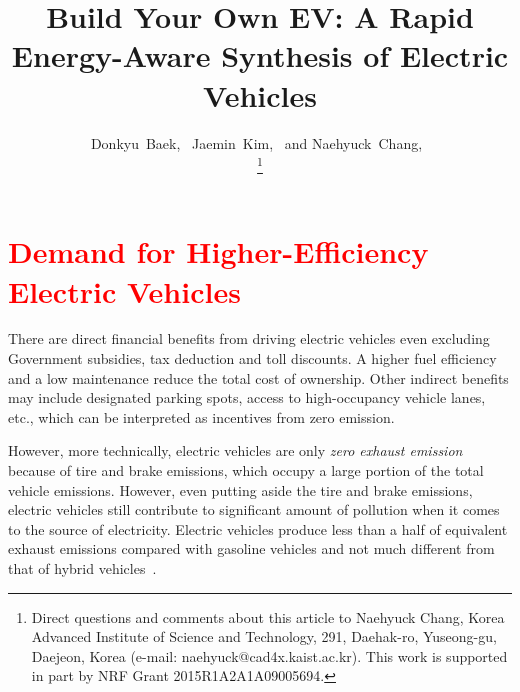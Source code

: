\documentclass[journal]{IEEEtran}
\begin{document}
\title{Build Your Own EV: A Rapid Energy-Aware Synthesis of Electric Vehicles}

\author{
	Donkyu~Baek,~
	Jaemin~Kim,~ and
	Naehyuck~Chang,~
	
\thanks{Direct questions and comments about this article to Naehyuck Chang, Korea Advanced Institute of Science and Technology, 291, Daehak-ro, Yuseong-gu, Daejeon, Korea (e-mail: naehyuck@cad4x.kaist.ac.kr). This work is supported in part by NRF Grant 2015R1A2A1A09005694.}
}

\maketitle



\section{\textcolor{red}{Demand for Higher-Efficiency Electric Vehicles}} \label{sec:motivation}

There are direct financial benefits from driving electric vehicles even excluding Government subsidies, tax deduction and toll discounts. A higher fuel efficiency and a low maintenance reduce the total cost of ownership. %
Other indirect benefits may include designated parking spots, access to high-occupancy vehicle lanes, etc., which can be interpreted as incentives from zero emission. %

However, more technically, electric vehicles are only \textit{zero exhaust emission}  because of tire and brake emissions, which occupy a large portion of the total vehicle emissions. However, even putting aside the tire and brake emissions, electric vehicles still contribute to significant amount of pollution when it comes to the source of electricity. Electric vehicles produce less than a half of equivalent exhaust emissions compared with gasoline vehicles and not much different from that of hybrid vehicles~\cite{AFDC}.
\end{document}
